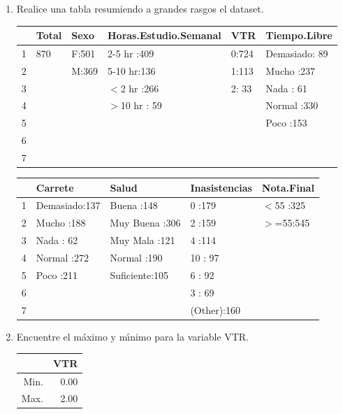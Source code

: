 \documentclass[12pt,letterpaper,hidelinks]{article}
\begin{document}
\begin{enumerate}[\hspace{.5cm} a)]

\item Realice una tabla resumiendo a grandes rasgos el dataset.
\begin{table}[ht]
\centering
\begin{tabular}{|rlllll|}
  \hline
 & Total & Sexo & Horas.Estudio.Semanal & VTR &    Tiempo.Libre \\ 
  \hline
1 & 870 & F:501   & 2-5 hr :409   & 0:724   & Demasiado: 89   \\ 
  2  & & M:369   & 5-10 hr:136   & 1:113   & Mucho    :237   \\ 
  3  & &  & $<$2 hr  :266   & 2: 33   & Nada     : 61   \\ 
  4  & &  & $>$10 hr : 59   &  & Normal   :330   \\ 
  5  & &  &  &  & Poco     :153   \\ 
  6  & &  &  &  &  \\ 
  7  & &  &  &  &  \\ 
   \hline
\end{tabular}
\end{table}

\begin{table}[ht]
\centering
\begin{tabular}{|rllll|}
  \hline
 &      Carrete &        Salud & Inasistencias & Nota.Final \\ 
  \hline
1 & Demasiado:137   & Buena     :148   & 0      :179   & $<$55 :325   \\ 
  2 & Mucho    :188   & Muy Buena :306   & 2      :159   & $>$=55:545   \\ 
  3 & Nada     : 62   & Muy Mala  :121   & 4      :114   &  \\ 
  4 & Normal   :272   & Normal    :190   & 10     : 97   &  \\ 
  5 & Poco     :211   & Suficiente:105   & 6      : 92   &  \\ 
  6 &  &  & 3      : 69   &  \\ 
  7 &  &  & (Other):160   &  \\ 
   \hline
\end{tabular}
\end{table}

\item Encuentre el máximo y mı́nimo para la variable VTR.
\begin{table}[ht]
\centering
\begin{tabular}{|rr|}
  \hline
 & VTR \\ 
  \hline
Min. & 0.00 \\ 
  Max. & 2.00 \\ 
   \hline
\end{tabular}
\end{table}


\end{enumerate}
\end{document}
